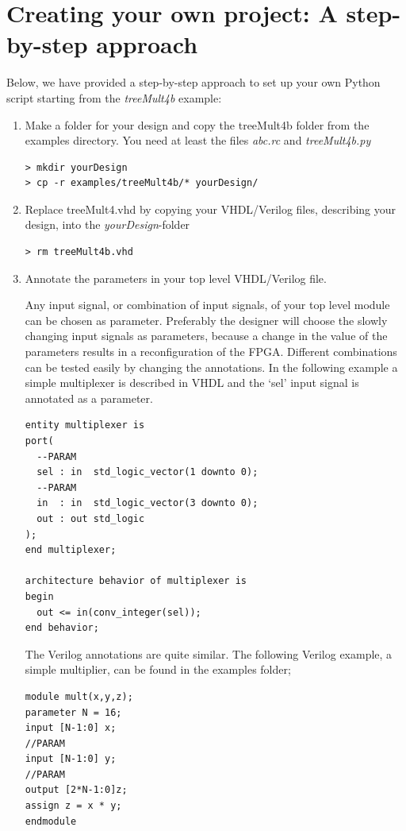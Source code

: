 \documentclass[a4paper,oneside]{memoir}
\begin{document}
\section{Creating your own project: A step-by-step approach}\label{sec:step_by_step}
Below, we have provided a step-by-step approach to set up your own Python script starting from the \emph{treeMult4b} example:
\begin{enumerate}
\item Make a folder for your design and copy the treeMult4b folder from the examples directory. You need at least the files \emph{abc.rc} and \emph{treeMult4b.py}
\begin{lstlisting}
> mkdir yourDesign
> cp -r examples/treeMult4b/* yourDesign/
\end{lstlisting}
\item Replace treeMult4.vhd by copying your VHDL/Verilog files, describing your design, into the \emph{yourDesign}-folder
\begin{lstlisting}
> rm treeMult4b.vhd
\end{lstlisting}
\item Annotate the parameters in your top level VHDL/Verilog file.

Any input signal, or combination of input signals, of your top level module can be chosen as parameter. Preferably the designer will choose the slowly changing input signals as parameters, because a change in the value of the parameters results in a reconfiguration of the FPGA. Different combinations can be tested easily by changing the annotations. In the following example a simple multiplexer is described in VHDL and the `sel' input signal is annotated as a parameter.
\lstset{language=VHDL}
\begin{lstlisting}
entity multiplexer is
port(
  --PARAM
  sel : in  std_logic_vector(1 downto 0);
  --PARAM
  in  : in  std_logic_vector(3 downto 0);
  out : out std_logic
);
end multiplexer;

architecture behavior of multiplexer is
begin
  out <= in(conv_integer(sel));
end behavior;
\end{lstlisting}
The Verilog annotations are quite similar. The following Verilog example, a simple multiplier, can be found in the examples folder;
\lstset{language=Verilog}
\begin{lstlisting}
module mult(x,y,z);
parameter N = 16;
input [N-1:0] x;
//PARAM
input [N-1:0] y;
//PARAM
output [2*N-1:0]z;
assign z = x * y;
endmodule
\end{lstlisting}
 

\end{enumerate}
\end{document}

